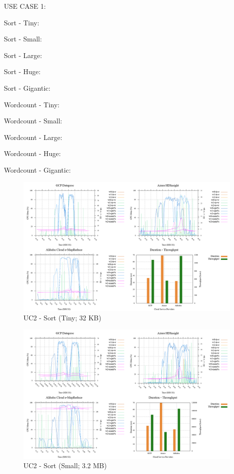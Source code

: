 \documentclass[review]{elsarticle}
\begin{document}
USE CASE 1: 

Sort - Tiny:

Sort - Small:

Sort - Large:

Sort - Huge:

Sort - Gigantic:

Wordcount - Tiny:

Wordcount - Small:

Wordcount - Large:

Wordcount - Huge:

Wordcount - Gigantic:

\begin{figure}[b]
	\caption{UC2 - Sort (Tiny; 32 KB)}
	\includegraphics[width=\textwidth]{uc2-srt-t-cmidt}
	\centering
\end{figure}

\begin{figure}[b]
	\caption{UC2 - Sort (Small; 3.2 MB)}
	\includegraphics[width=\textwidth]{uc2-srt-s-cmidt}
	\centering
\end{figure}
\end{document}

